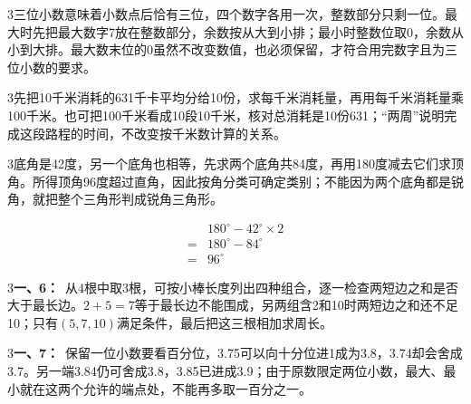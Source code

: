 \documentclass[multi=snippet,border={5bp 20bp 5bp 5bp}]{standalone}
\newenvironment{snippet}[3]{\begin{minipage}{#1bp}\color{answerred}\fontsize{#2}{#3}\selectfont\raggedright}{\end{minipage}}
\begin{document}
\begin{snippet}{505}{11.5}{14}\begin{multicols}{3}\raggedcolumns 三位小数意味着小数点后恰有三位，四个数字各用一次，整数部分只剩一位。最大时先把最大数字7放在整数部分，余数按从大到小排；最小时整数位取0，余数从小到大排。最大数末位的0虽然不改变数值，也必须保留，才符合用完数字且为三位小数的要求。\end{multicols}\end{snippet}
\begin{snippet}{505}{11.5}{14}\begin{multicols}{3}\raggedcolumns 先把10千米消耗的631千卡平均分给10份，求每千米消耗量，再用每千米消耗量乘100千米。也可把100千米看成10段10千米，核对总消耗是10份631；“两周”说明完成这段路程的时间，不改变按千米数计算的关系。\end{multicols}\end{snippet}
\begin{snippet}{505}{11.5}{14}\begin{multicols}{3}\raggedcolumns 底角是42度，另一个底角也相等，先求两个底角共84度，再用180度减去它们求顶角。所得顶角96度超过直角，因此按角分类可确定类别；不能因为两个底角都是锐角，就把整个三角形判成锐角三角形。\par \[\begin{aligned}&180^\circ-42^\circ\times2\\={}&180^\circ-84^\circ\\={}&96^\circ\end{aligned}\]\end{multicols}\end{snippet}
\begin{snippet}{505}{11.5}{14}\begin{multicols}{3}\raggedcolumns \textbf{一、6：}\ 从4根中取3根，可按小棒长度列出四种组合，逐一检查两短边之和是否大于最长边。\(2+5=7\)\allowbreak 等于最长边不能围成，另两组含2和10时两短边之和还不足10；只有\((5,\allowbreak 7,\allowbreak 10)\)\allowbreak 满足条件，最后把这三根相加求周长。\end{multicols}\end{snippet}
\begin{snippet}{505}{11.5}{14}\begin{multicols}{3}\raggedcolumns \textbf{一、7：}\ 保留一位小数要看百分位，3.75可以向十分位进1成为3.8，3.74却会舍成3.7。另一端3.84仍可舍成3.8，3.85已进成3.9；由于原数限定两位小数，最大、最小就在这两个允许的端点处，不能再多取一百分之一。\end{multicols}\end{snippet}
\end{document}

